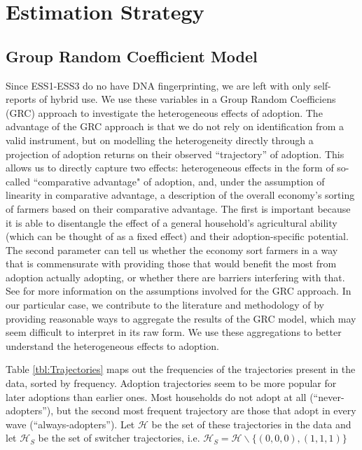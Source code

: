 \documentclass[11pt]{article}
\begin{document}
\section{Estimation Strategy}\label{sec:strategy}

\subsection{Group Random Coefficient Model}

Since ESS1-ESS3 do no have DNA fingerprinting, we are left with only self-reports of hybrid use. We use these variables in a Group Random Coefficiens (GRC) approach to investigate the heterogeneous effects of adoption. The advantage of the GRC approach is that we do not rely on identification from a valid instrument, but on modelling the heterogeneity directly through a projection of adoption returns on their observed ``trajectory'' of adoption. This allows us to directly capture two effects: heterogeneous effects in the form of so-called ``comparative advantage" of adoption, and, under the assumption of linearity in comparative advantage, a description of the overall economy's sorting of farmers based on their comparative advantage. The first is important because it is able to disentangle the effect of a general household's agricultural ability (which can be thought of as a fixed effect) and their adoption-specific potential. The second parameter can tell us whether the economy sort farmers in a way that is commensurate with providing those that would benefit the most from adoption actually adopting, or whether there are barriers interfering with that. See \cite{Tjernstrom_Emilia_Dalia_Ghanem_Oscar_Barriga_Cabanillas_Travis_J_Lybbert_Jeffrey_D_Michler_and_Aleksandr_Michuda2020-bc} for more information on the assumptions involved for the GRC approach. In our particular case, we contribute to the literature and methodology of \cite{Tjernstrom_Emilia_Dalia_Ghanem_Oscar_Barriga_Cabanillas_Travis_J_Lybbert_Jeffrey_D_Michler_and_Aleksandr_Michuda2020-bc} by providing reasonable ways to aggregate the results of the GRC model, which may seem difficult to interpret in its raw form. We use these aggregations to better understand the heterogeneous effects to adoption.



Table \ref{tbl:Trajectories} maps out the frequencies of the trajectories present in the data, sorted by frequency. Adoption trajectories seem to be more popular for later adoptions than earlier ones. Most households do not adopt at all (``never-adopters''), but the second most frequent trajectory are those that adopt in every wave (``always-adopters''). Let $\mathcal{H}$ be the set of these trajectories in the data and let $\mathcal{H}_S$ be the set of switcher trajectories, i.e. $\mathcal{H}_S = \mathcal{H}\backslash\{(0,0,0), (1,1,1)\}$
\end{document}
